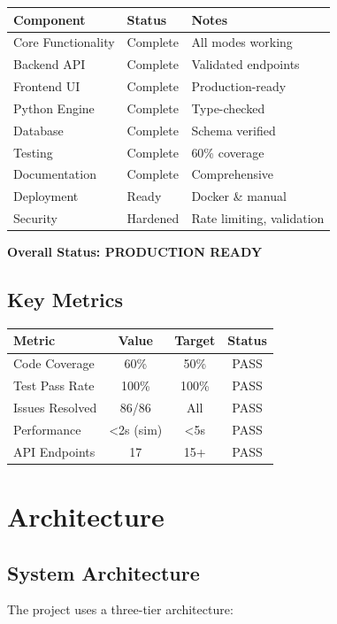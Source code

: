 \documentclass[12pt,a4paper]{report}
\begin{document}
\begin{tabular}{|l|l|l|}
\hline
\textbf{Component} & \textbf{Status} & \textbf{Notes} \\
\hline
Core Functionality & Complete & All modes working \\
Backend API & Complete & Validated endpoints \\
Frontend UI & Complete & Production-ready \\
Python Engine & Complete & Type-checked \\
Database & Complete & Schema verified \\
Testing & Complete & 60\% coverage \\
Documentation & Complete & Comprehensive \\
Deployment & Ready & Docker \& manual \\
Security & Hardened & Rate limiting, validation \\
\hline
\end{tabular}

\vspace{0.5cm}
\textbf{Overall Status: PRODUCTION READY}

\section{Key Metrics}

\begin{tabular}{|l|c|c|c|}
\hline
\textbf{Metric} & \textbf{Value} & \textbf{Target} & \textbf{Status} \\
\hline
Code Coverage & 60\% & 50\% & PASS \\
Test Pass Rate & 100\% & 100\% & PASS \\
Issues Resolved & 86/86 & All & PASS \\
Performance & <2s (sim) & <5s & PASS \\
API Endpoints & 17 & 15+ & PASS \\
\hline
\end{tabular}

\chapter{Architecture}

\section{System Architecture}

The project uses a three-tier architecture:
\end{document}
